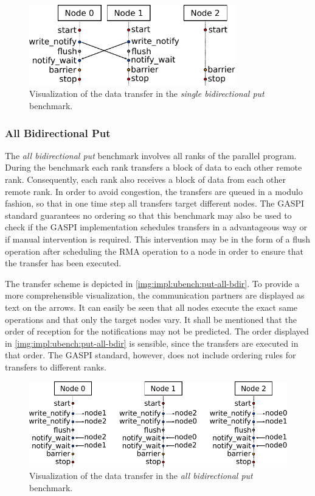 \begin{figure}[htb]
\centering
\includegraphics[width=0.8\textwidth]{img/bench-put-single-bdir}
\caption{Visualization of the data transfer in the \emph{single bidirectional put} benchmark.}
\label{img:impl:ubench:put-single-bdir}
\end{figure}

\subsubsection*{All Bidirectional Put}

The \emph{all bidirectional put} benchmark involves all ranks of the parallel program. During the benchmark each rank transfers a block of data to each other remote rank. Consequently, each rank also receives a block of data from each other remote rank. In order to avoid congestion, the transfers are queued in a modulo fashion, so that in one time step all transfers target different nodes. The \ac{GASPI} standard guarantees no ordering so that this benchmark may also be used to check if the \ac{GASPI} implementation schedules transfers in a advantageous way or if manual intervention is required. This intervention may be in the form of a flush operation after scheduling the \ac{RMA} operation to a node in order to ensure that the transfer has been executed.

The transfer scheme is depicted in \autoref{img:impl:ubench:put-all-bdir}. To provide a more comprehensible visualization, the communication partners are displayed as text on the arrows. It can easily be seen that all nodes execute the exact same operations and that only the target nodes vary. It shall be mentioned that the order of reception for the notifications may not be predicted. The order displayed in \autoref{img:impl:ubench:put-all-bdir} is sensible, since the transfers are executed in that order. The \ac{GASPI} standard, however, does not include ordering rules for transfers to different ranks.


\begin{figure}[htb]
\centering
\includegraphics[width=\textwidth]{img/bench-put-all-bdir}
\caption{Visualization of the data transfer in the \emph{all bidirectional put} benchmark.}
\label{img:impl:ubench:put-all-bdir}
\end{figure}


